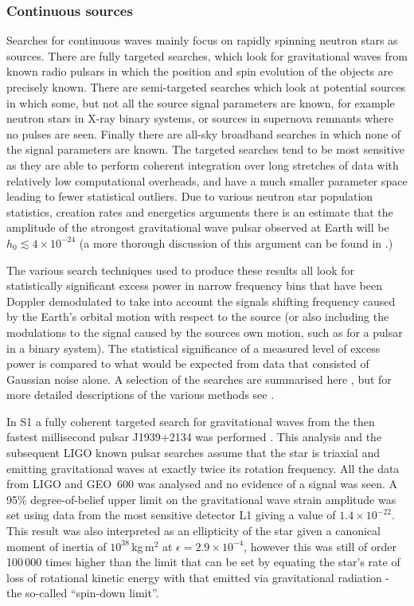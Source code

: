 \documentclass{article}
\begin{document}
\subsubsection{Continuous sources}
Searches for continuous waves mainly focus on rapidly spinning neutron stars as
sources. There are fully targeted searches, which look for gravitational waves
from known radio pulsars in which the position and spin evolution of the objects
are precisely known. There are semi-targeted searches which look at potential
sources in which some, but not all the source signal parameters are known, for
example neutron stars in X-ray binary systems, or sources in supernova remnants
where no pulses are seen. Finally there are all-sky broadband searches in which
none of the signal parameters are known. The targeted searches tend to be most
sensitive as they are able to perform coherent integration over long stretches
of data with relatively low computational overheads, and have a much smaller
parameter space leading to fewer statistical outliers. Due to various neutron
star population statistics, creation rates and energetics arguments there is an
estimate that the amplitude of the strongest gravitational wave pulsar observed
at Earth will be $h_0 \lesssim 4\times10^{-24}$ \cite{Abbott:2007a} (a more
thorough discussion of this argument can be found in \cite{Knispel:2008}.)

The various search techniques used to produce these results all look for
statistically significant excess power in narrow frequency bins that have been
Doppler demodulated to take into account the signals shifting frequency
caused by the Earth's orbital motion with respect to the source (or also
including the modulations to the signal caused by the sources own motion, such
as for a pulsar in a binary system). The statistical significance of a measured
level of excess power is compared to what would be expected from data that
consisted of Gaussian noise alone. A selection of the searches are summarised
here \cite{Prix:2006}, but for more detailed descriptions of the various methods
see \cite{Brady:2000, Krishnan:2004, Jaranowski:1998, Abbott:2008e,
Abbott:2007a, Dupuis:2005}.

In S1 a fully coherent targeted search for gravitational waves from the then
fastest millisecond pulsar J1939+2134 was performed \cite{Abbott:2004d}. This
analysis and the subsequent LIGO known pulsar searches assume that the star is
triaxial and emitting gravitational waves at exactly twice its rotation
frequency. All the data from LIGO and GEO~600 was analysed and no evidence of a
signal was seen. A 95\% degree-of-belief upper limit on the gravitational wave
strain amplitude was set using data from the most sensitive detector L1 giving a
value of $1.4\times10^{-22}$. This result was also interpreted as an ellipticity
of the star given a canonical moment of inertia of $10^{38}$\,kg\,m$^2$ at
$\epsilon = 2.9\times10^{-4}$, however this was still of order 100\,000 times
higher than the limit that can be set by equating the star's rate of loss
of rotational kinetic energy with that emitted via gravitational radiation - the
so-called ``spin-down limit''.
\end{document}
